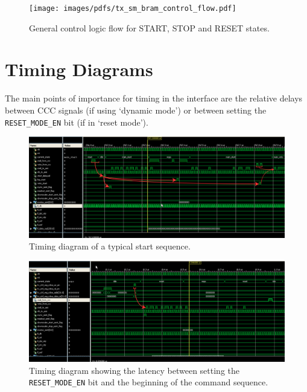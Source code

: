 \documentclass[]{report}
\begin{document}
    \begin{figure}[htbp]
        \centering
            \texttt{[image: images/pdfs/tx\_sm\_bram\_control\_flow.pdf]}
        \caption{General control logic flow for START, STOP and RESET states.}
        \label{fig:tx_sm_bram_control_flow}
    \end{figure}
    \chapter{Timing Diagrams} %
    \label{cha:timing_diagrams}
    The main points of importance for timing in the interface are the relative delays between CCC signals (if using `dynamic mode') or between setting the \texttt{RESET\_MODE\_EN} bit (if in `reset mode').
    \begin{figure}[htbp]
        \centering
            \includegraphics[width=\textwidth]{images/isim/edited/start_sequence.png}
        \caption{Timing diagram of a typical start sequence.}
        \label{fig:images_isim_edited_start_sequence}
    \end{figure}
    
     \begin{figure}[htbp]
         \centering
             \includegraphics[width=\textwidth]{images/isim/edited/reset_mode.png}
         \caption{Timing diagram showing the latency between setting the \texttt{RESET\_MODE\_EN} bit and the beginning of the command sequence.}
         \label{fig:reset_mode_timing}
     \end{figure}
     
\end{document}

